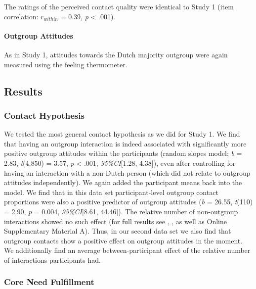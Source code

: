 The ratings of the perceived contact quality were identical to Study 1
(item correlation: \(r_{within}\) = 0.39, \textit{p} \textless{} .001).

\paragraph{Outgroup Attitudes}

As in Study 1, attitudes towards the Dutch majority outgroup were again
measured using the feeling thermometer.

\subsection{Results}

\subsubsection{Contact Hypothesis}

We tested the most general contact hypothesis as we did for Study 1. We
find that having an outgroup interaction is indeed associated with
significantly more positive outgroup attitudes within the participants
(random slopes model; \textit{b} = 2.83, \textit{t}(4,850) = 3.57,
\textit{p} \textless{} .001, \textit{95\%CI}{[}1.28, 4.38{]}), even
after controlling for having an interaction with a non-Dutch person
(which did not relate to outgroup attitudes independently). We again
added the participant means back into the model. We find that in this
data set participant-level outgroup contact proportions were also a
positive predictor of outgroup attitudes (\textit{b} = 26.55,
\textit{t}(110) = 2.90, \textit{p} = 0.004, \textit{95\%CI}{[}8.61,
44.46{]}). The relative number of non-outgroup interactions showed no
such effect (for full results see ,
, as well as Online Supplementary Material
A). Thus, in our second data set we also find that outgroup contacts
show a positive effect on outgroup attitudes in the moment. We
additionally find an average between-participant effect of the relative
number of interactions participants had.

\subsubsection{Core Need Fulfillment}


